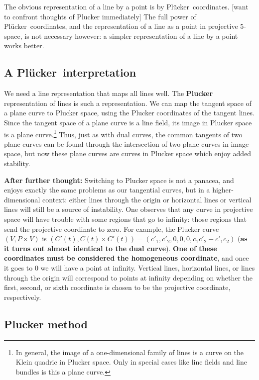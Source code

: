 \documentclass[11pt]{article}
\newcommand{\plucker}{Pl\"{u}cker\ }
\begin{document}
The obvious representation of a line by a point is by \plucker coordinates.
[want to confront thoughts of Plucker immediately]
The full power of \plucker coordinates, and the representation of a line
as a point in projective 5-space, is not necessary however: a simpler
representation of a line by a point works better.

\subsection{A \plucker interpretation}

We need a line representation that maps all lines well.
The {\bf Plucker} representation of lines is such a representation.
We can map the tangent space of a plane curve to Plucker space,
using the Plucker coordinates of the tangent lines.
Since the tangent space of a plane curve is a line field, 
its image in Plucker space is a plane curve.\footnote{In general,
	the image of a one-dimensional family of lines is a curve
	on the Klein quadric in Plucker space.
	Only in special cases like line fields and line bundles 
	is this a plane curve.}
Thus, just as with dual curves,
the common tangents of two plane curves can
be found through the intersection of two plane curves in image space,
but now these plane curves are curves in Plucker space
which enjoy added stability.

{\bf After further thought:}
Switching to Plucker space is not a panacea, and enjoys exactly the
same problems as our tangential curves, but in a higher-dimensional context: 
either lines through the origin or horizontal lines or vertical lines will still
be a source of instability.
One observes that any curve in projective space will have trouble with some 
regions that go to infinity: those regions that send the projective coordinate 
to zero.
For example, the Plucker curve $(V,P \times V)$ is
$(C'(t),C(t) \times C'(t)) = (c'_1,c'_2,0,0,0,c_1c'_2 - c'_1c_2)$
({\bf as it turns out almost identical to the dual curve}).
{\bf One of these coordinates must be considered the homogeneous coordinate},
and once it goes to 0 we will have a point at infinity.
Vertical lines, horizontal lines, or lines through the origin will
correspond to points at infinity depending on whether the first, second,
or sixth coordinate is chosen to be the projective coordinate, respectively.

\subsection{Plucker method}
\end{document}

